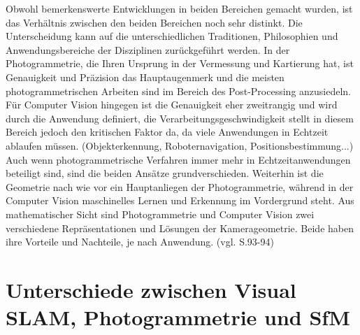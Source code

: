 Obwohl bemerkenswerte Entwicklungen in beiden Bereichen gemacht wurden, ist das Verhältnis zwischen den beiden Bereichen noch sehr distinkt. Die Unterscheidung kann auf die unterschiedlichen Traditionen, Philosophien und Anwendungsbereiche der Disziplinen zurückgeführt werden. In der Photogrammetrie, die Ihren Ursprung in der Vermessung und Kartierung hat, ist Genauigkeit und Präzision das Hauptaugenmerk und die meisten photogrammetrischen Arbeiten sind im Bereich des Post-Processing anzusiedeln. Für Computer Vision hingegen ist die Genauigkeit eher zweitrangig und wird durch die Anwendung definiert, die Verarbeitungsgeschwindigkeit stellt in diesem Bereich jedoch den kritischen Faktor da, da viele Anwendungen in Echtzeit ablaufen müssen. (Objekterkennung, Roboternavigation, Positionsbestimmung...) Auch wenn photogrammetrische Verfahren immer mehr in Echtzeitanwendungen beteiligt sind, sind die beiden Ansätze grundverschieden. Weiterhin ist die Geometrie nach wie vor ein Hauptanliegen der Photogrammetrie, während in der Computer Vision maschinelles Lernen und Erkennung im Vordergrund steht. Aus mathematischer Sicht sind Photogrammetrie und Computer Vision zwei verschiedene Repräsentationen und Lösungen der Kamerageometrie. Beide haben ihre Vorteile und Nachteile, je nach Anwendung. (vgl. \cite{ph_vs_cv} S.93-94)

\section{Unterschiede zwischen Visual SLAM, Photogrammetrie und SfM}

